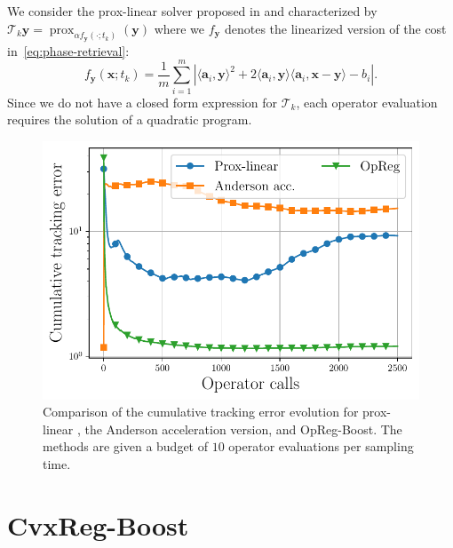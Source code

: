 \documentclass{article}
\DeclareMathOperator{\prox}{prox}
\newcommand{\av}{\mathbold{a}}
\newcommand{\x}{\mathbold{x}}
\newcommand{\y}{\mathbold{y}}
\newcommand{\T}{\mathcal{T}}
\begin{document}
We consider the prox-linear solver proposed in \cite{drusvyatskiy_error_2018} and characterized by $\T_k \y = \prox_{\alpha f_\y(\cdot; t_k)}(\y)$ where we $f_\y$ denotes the linearized version of the cost in~\eqref{eq:phase-retrieval}:
$$
	f_\y(\x; t_k) = \frac{1}{m} \sum_{i = 1}^m \left| \langle \av_i, \y \rangle^2 + 2 \langle \av_i, \y \rangle \langle \av_i, \x - \y \rangle - b_i \right|.
$$
Since we do not have a closed form expression for $\T_k$, each operator evaluation requires the solution of a quadratic program.

\begin{figure}[ht]
\vskip 0.2in
\begin{center}
\centerline{\includegraphics[width=\columnwidth]{Figures/phase_retrieval}}
\caption{Comparison of the cumulative tracking error evolution for prox-linear \cite{drusvyatskiy_error_2018}, the Anderson acceleration version, and OpReg-Boost. The methods are given a budget of $10$ operator evaluations per sampling time.}
\label{fig:phase-retrieval}
\end{center}
\vskip -0.2in
\end{figure}



\newpage 





\newpage
\appendix

\section{CvxReg-Boost}
\end{document}
